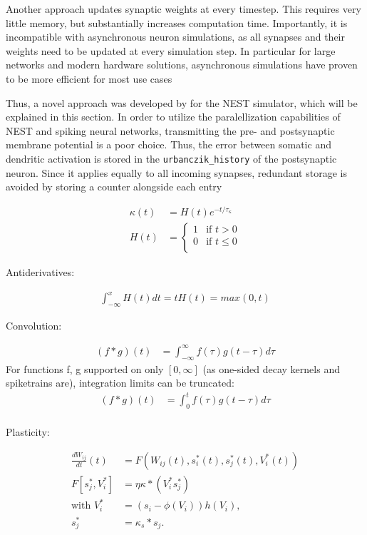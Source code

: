 Another approach updates synaptic weights at every timestep. This requires very little memory, but substantially
increases computation time. Importantly, it is incompatible with asynchronous neuron simulations, as all synapses and
their weights need to be updated at every simulation step. In particular for large networks and modern hardware
solutions, asynchronous simulations have proven to be more efficient for most use cases 

Thus, a novel approach was developed by \cite{Stapmanns2021} for the NEST simulator, which will be explained in this
section. In order to utilize the paralellization capabilities of NEST and spiking neural networks, transmitting the pre-
and postsynaptic membrane potential is a poor choice. Thus, the error between somatic and dendritic activation is stored
in the \texttt{urbanczik\_history} of the postsynaptic neuron. Since it applies equally to all incoming synapses,
redundant storage is avoided by storing a counter alongside each entry



\begin{align}
  \kappa(t) & = H(t)e^{-t/\tau_{\kappa}} \\
  H(t)      & =
  \begin{cases}
    1 & \text{if $t > 0$}    \\
    0 & \text{if $t \leq 0$} \\
  \end{cases}
\end{align}

Antiderivatives:

\begin{align}
  \int_{-\infty}^x H(t)dt = tH(t) = max(0,t)
\end{align}

Convolution:

\begin{align}
  (f \ast g)(t) & = \int_{- \infty }^{\infty} f(\tau) g(t-\tau) d \tau
\end{align}
For functions f, g supported on only $[0, \infty]$ (as one-sided decay kernels and spiketrains are), integration limits
can be truncated:
\begin{align}
  (f \ast g)(t) & = \int_{0}^{t} f(\tau) g(t-\tau) d \tau \\
\end{align}


Plasticity:

\begin{align}
  \frac{dW_{ij}}{dt}(t) & = F(W_{ij}(t), s_i^\ast (t), s_j^\ast (t), V_i^\ast (t)) \\
  F[s_j^\ast, V_i^\ast] & = \eta \kappa \ast (V_i^\ast s_j^\ast)                   \\
  \text{with } V_i^\ast & = (s_i - \phi(V_i )) h(V_i),                             \\
  s_j^\ast              & = \kappa_s \ast s_j.
\end{align}

